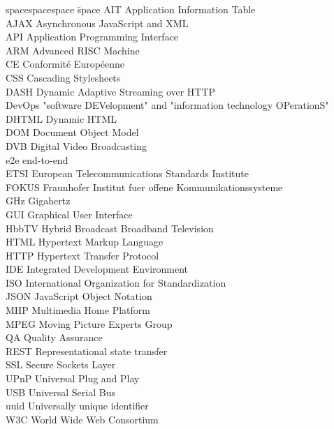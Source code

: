 
\begin{tabbing}
spacespacespace \= space \kill
AIT \> Application Information Table\\
AJAX \> Asynchronous JavaScript and XML\\
API \> Application Programming Interface\\
ARM \> Advanced RISC Machine\\
CE \> Conformité Européenne\\
CSS \> Cascading Stylesheets\\
DASH \> Dynamic Adaptive Streaming over HTTP\\
DevOps \> "software DEVelopment" and "information technology OPerationS"\\
DHTML \> Dynamic HTML\\
DOM \> Document Object Model\\
DVB \> Digital Video Broadcasting\\
e2e \> end-to-end\\
ETSI \> European Telecommunications Standards Institute\\
FOKUS \> Fraunhofer Institut fuer offene Kommunikationssysteme\\
GHz \> Gigahertz\\
GUI \> Graphical User Interface\\
HbbTV \> Hybrid Broadcast Broadband Television\\
HTML \> Hypertext Markup Language\\
HTTP \> Hypertext Transfer Protocol\\
IDE \> Integrated Development Environment\\
ISO \> International Organization for Standardization\\
JSON \> JavaScript Object Notation\\
MHP \> Multimedia Home Platform\\
MPEG \> Moving Picture Experts Group\\
QA \> Quality Assurance\\
REST \> Representational state transfer\\
SSL \> Secure Sockets Layer\\
UPnP \> Universal Plug and Play\\
USB \> Universal Serial Bus\\
uuid \> Universally unique identifier\\
W3C \> World Wide Web Consortium\\
\end{tabbing}
\endinput
